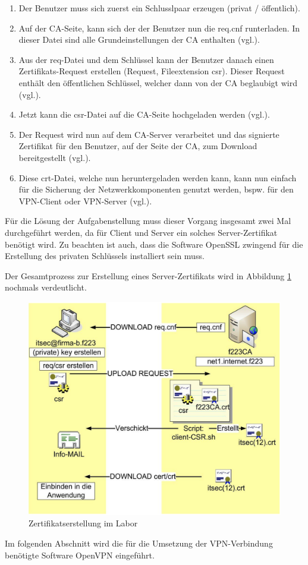 \documentclass[
a4paper,     %
 headsepline, %
footsepline, %
titlepage,   %
 halfparskip,     %
 fleqn,       %
12pt         %
]{scrartcl}  %
\begin{document}
\begin{enumerate}
\item Der Benutzer muss sich zuerst ein Schlusslpaar erzeugen (privat / öffentlich)\cite{JueNeuSaDue}.
\item Auf der CA-Seite, kann sich der der Benutzer nun die req.cnf runterladen. In dieser Datei sind alle Grundeinstellungen der CA enthalten (vgl.\cite{JueNeuSaDue}). 
\item Aus der req-Datei und dem Schlüssel kann der Benutzer danach einen Zertifikats-Request erstellen (Request, Fileextension csr). Dieser Request enthält den öffentlichen Schlüssel, welcher dann von der CA beglaubigt wird (vgl.\cite{JueNeuSaDue}). 
\item Jetzt kann die csr-Datei auf die CA-Seite hochgeladen werden (vgl.\cite{JueNeuSaDue}). 
\item Der Request wird nun auf dem CA-Server verarbeitet und das signierte Zertifikat für den Benutzer, auf der Seite der CA, zum Download bereitgestellt (vgl.\cite{JueNeuSaDue}). 
\item Diese crt-Datei, welche nun heruntergeladen werden kann, kann nun einfach für die Sicherung der Netzwerkkomponenten genutzt werden, bspw. für den VPN-Client oder VPN-Server (vgl.\cite{JueNeuSaDue}).  
\end{enumerate}

Für die Lösung der Aufgabenstellung muss dieser Vorgang insgesamt zwei Mal durchgeführt werden, da für Client und Server ein solches Server-Zertifikat benötigt wird. Zu beachten ist auch, dass die Software OpenSSL zwingend für die Erstellung des privaten Schlüssels installiert sein muss.

Der Gesamtprozess zur Erstellung eines Server-Zertifikats wird in Abbildung \ref{fig:Zertifikaserstellung} nochmals verdeutlicht.  
\begin{figure}[!h]
	\includegraphics[width=\textwidth]{pictures/Zertifikatserstellung.png}
	\caption{Zertifikatserstellung im Labor\cite{JueNeuSaDue}}
	\label{fig:Zertifikaserstellung}
\end{figure}
\newpage
Im folgenden Abschnitt wird die für die Umsetzung der VPN-Verbindung benötigte Software OpenVPN eingeführt. 
\newpage
\end{document}
